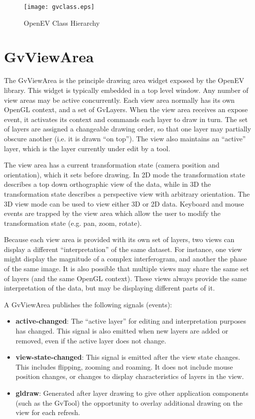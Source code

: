 \documentclass{openevreport}
\begin{document}
\begin{figure}
\centering
\texttt{[image: gvclass.eps]}
\caption{OpenEV Class Hierarchy}
\label{fig:gvclass}
\end{figure}

\section{GvViewArea}

The GvViewArea is the principle drawing area widget exposed by the
OpenEV library.  This widget is typically embedded in a top level
window.  Any number of view areas may be active concurrently.  Each
view area normally has its own OpenGL context, and a set of GvLayers.
When the view area receives an expose event, it activates its context 
and commands each layer to draw in turn.  The set of layers are
assigned a changeable drawing order, so that one layer may partially
obscure another (i.e. it is drawn ``on top'').  The view also
maintains an ``active'' layer, which is the layer currently under edit 
by a tool.

The view area has a current transformation state (camera position and
orientation), which it sets before drawing.  In 2D mode the transformation
state describes a top down orthographic view of the data, while in 3D
the transformation state describes a perspective view with arbitrary
orientation. The 3D view mode can be used to view either 3D or 2D data.
Keyboard and mouse events are
trapped by the view area which allow the user to modify the
transformation state (e.g. pan, zoom, rotate).

Because each view area is provided with its own set of layers, two views
can display a different ``interpretation'' of the same dataset.  For
instance, one view might display the magnitude of a complex
interferogram, and another the phase of the same image.  It is also
possible that multiple views may share the same set of layers (and
the same OpenGL context).  These views always provide the same
interpretation of the data, but may be displaying different parts of
it.

A GvViewArea publishes the following signals (events):
\begin{itemize}
\item {\bf active-changed}: The ``active layer'' for editing and 
interpretation purposes has changed.  This signal is also emitted when 
new layers are added or removed, even if the active layer does not change.

\item {\bf view-state-changed}: This signal is emitted after the view state 
changes.
This includes flipping, zooming and roaming.  It does not include mouse
position changes, or changes to display characteristics of layers in the
view. 

\item {\bf gldraw}: Generated after layer drawing to give other application
components (such as the GvTool) the opportunity to overlay additional 
drawing on the view for each refresh.

\end{itemize}
\end{document}
